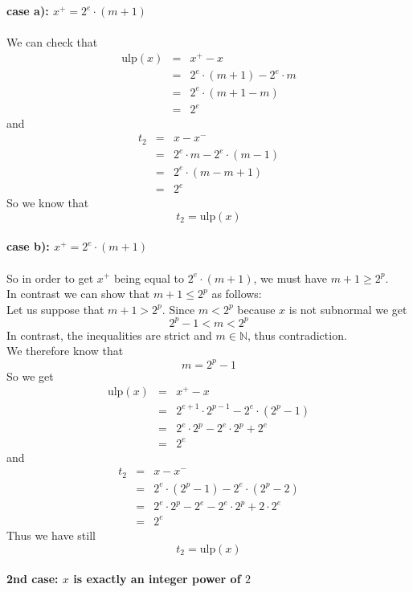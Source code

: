 \documentclass[a4paper,10pt,twoside]{article}
\newenvironment{proof}[1][Proof]{\begin{trivlist}
\item[\hskip \labelsep {\bfseries #1}]}{\end{trivlist}}
\newcommand{\N}{\ensuremath{\mathbb {N}}}
\newcommand{\mUlp}{\ensuremath{\mathrm{ulp}}}
\begin{document}
\begin{proof}
{\bf case a): $x^+ = 2^e \cdot \left( m + 1 \right)$} \\ ~ \\
We can check that 
\begin{eqnarray*}
\mUlp \left( x \right) & = & x^+ - x \\
& = & 2^e \cdot \left( m + 1 \right) - 2^e \cdot m \\
& = & 2^e \cdot \left(m + 1 - m \right) \\
& = & 2^e
\end{eqnarray*}
and
\begin{eqnarray*}
t_2 & = & x - x^- \\
& = & 2^e \cdot m - 2^e \cdot \left( m - 1 \right) \\
& = & 2^e \cdot \left( m - m + 1 \right) \\
& = & 2^e
\end{eqnarray*}
So we know that
$$t_2 = \mUlp \left( x \right)$$ ~ \\
{\bf case b): $x^+ = 2^e \cdot \left( m + 1 \right)$} \\ ~ \\
So in order to get $x^+$ being equal to $2^e \cdot \left( m + 1 \right)$, we must have $m+1 \geq 2^p$. \\
In contrast we can show that $m+1 \leq 2^p$ as follows: \\
Let us suppose that $m+1 > 2^p$. Since $m < 2^p$ because $x$ is not subnormal we get
$$2^p - 1 < m < 2^p$$
In contrast, the inequalities are strict and $m \in \N$, thus contradiction. \\
We therefore know that
$$m=2^p - 1$$
So we get
\begin{eqnarray*}
\mUlp \left( x \right) & = & x^+ - x \\
& = & 2^{e+1} \cdot 2^{p-1} - 2^e \cdot \left( 2^p - 1 \right) \\
& = & 2^e \cdot 2^p - 2^e \cdot 2^p + 2^e \\
& = & 2^e
\end{eqnarray*}
and
\begin{eqnarray*}
t_2 & = & x - x^- \\
& = & 2^e \cdot \left( 2^p - 1 \right) - 2^e \cdot \left( 2^p - 2 \right) \\
& = & 2^e \cdot 2^p - 2^e - 2^e \cdot 2^p + 2 \cdot 2^e \\
& = & 2^e
\end{eqnarray*}
Thus we have still 
$$t_2 = \mUlp \left( x \right)$$ ~ \\
{\bf 2nd case: $x$ is exactly an integer power of $2$ } \\ ~ \\

\end{proof}
\end{document}
